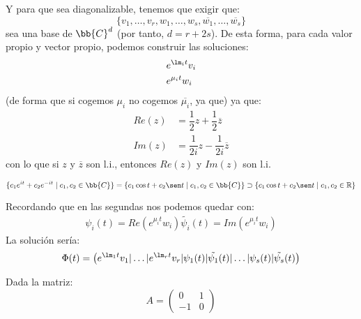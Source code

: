 \begin{enumerate}
        Y para que sea diagonalizable, tenemos que exigir que: 
        \begin{equation*}
            \{v_1,\ldots,v_r,w_1,\ldots,w_s,\overline{w_1},\ldots,\overline{w_s}\}
        \end{equation*}
        sea una base de $\bb{C}^d$ (por tanto, $d=r+2s$). De esta forma, para cada valor propio y vector propio, podemos construir las soluciones:
        \begin{align*}
            &e^{\lm_i t} v_i \\
            &e^{\mu_i t} w_i
        \end{align*}
        (de forma que si cogemos $\mu_i$ no cogemos $\overline{\mu_i}$, ya que)
        ya que:
        \begin{align*}
            Re(z) &= \dfrac{1}{2}z + \dfrac{1}{2}\overline{z} \\
            Im(z) &= \dfrac{1}{2i}z - \dfrac{1}{2i}\overline{z}
        \end{align*}
        con lo que si $z$ y $\overline{z}$ son l.i., entonces $Re(z)$ y $Im(z)$ son l.i.
        \begin{ejemplo}
            \begin{equation*}
                \{c_1 e^{it}+c_2e^{-it}\mid c_1,c_2\in \bb{C}\} = \{c_1\cos t + c_2\sen t\mid c_1,c_2\in \bb{C}\} \supset \{c_1\cos t + c_2\sen t \mid c_1,c_2\in \mathbb{R}\}
            \end{equation*}
        \end{ejemplo}
        Recordando que en las segundas nos podemos quedar con:
        \begin{align*}
            \psi_i(t) = Re(e^{\mu_i t} w_i)
            \tilde{\psi_i}(t) = Im(e^{\mu_i t} w_i)
        \end{align*}
        La solución sería:
        \begin{equation*}
            \Phi(t) = \left(e^{\lm_1t}v_1|\ldots|e^{\lm_rt}v_r|\psi_1(t)|\tilde{\psi_1}(t)|\ldots|\psi_s(t)|\tilde{\psi_s}(t)\right)
        \end{equation*}
        \begin{ejemplo}
            Dada la matriz:
            \begin{equation*}
                A = \left(\begin{array}{cc}
                        0 & 1 \\
                        -1 & 0
                \end{array}\right)
            \end{equation*}

\end{ejemplo}
\end{enumerate}
